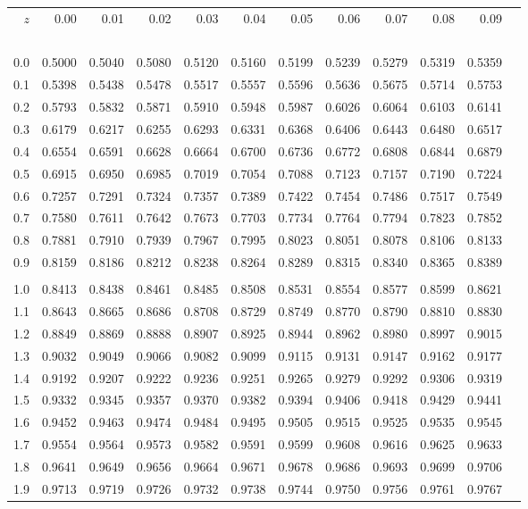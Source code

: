 \documentclass[a4paper,12pt, twoside]{article}
\begin{document}
\begin{center}
\renewcommand{\arraystretch}{0.8}
\small
\begin{tabular}{rr@{\ }r@{\ }r@{\ }r@{\ }r@{\ }r@{\ }r@{\ }r@{\ }r@{\ }r@{\ }r}
$z$&0.00&0.01&0.02&0.03&0.04&0.05&0.06&0.07&0.08&0.09\\
\ \\
0.0&0.5000&0.5040&0.5080&0.5120&0.5160&0.5199&0.5239&0.5279&0.5319&0.5359\\
0.1&0.5398&0.5438&0.5478&0.5517&0.5557&0.5596&0.5636&0.5675&0.5714&0.5753\\
0.2&0.5793&0.5832&0.5871&0.5910&0.5948&0.5987&0.6026&0.6064&0.6103&0.6141\\
0.3&0.6179&0.6217&0.6255&0.6293&0.6331&0.6368&0.6406&0.6443&0.6480&0.6517\\
0.4&0.6554&0.6591&0.6628&0.6664&0.6700&0.6736&0.6772&0.6808&0.6844&0.6879\\
0.5&0.6915&0.6950&0.6985&0.7019&0.7054&0.7088&0.7123&0.7157&0.7190&0.7224\\
0.6&0.7257&0.7291&0.7324&0.7357&0.7389&0.7422&0.7454&0.7486&0.7517&0.7549\\
0.7&0.7580&0.7611&0.7642&0.7673&0.7703&0.7734&0.7764&0.7794&0.7823&0.7852\\
0.8&0.7881&0.7910&0.7939&0.7967&0.7995&0.8023&0.8051&0.8078&0.8106&0.8133\\
0.9&0.8159&0.8186&0.8212&0.8238&0.8264&0.8289&0.8315&0.8340&0.8365&0.8389\\
\\
1.0&0.8413&0.8438&0.8461&0.8485&0.8508&0.8531&0.8554&0.8577&0.8599&0.8621\\
1.1&0.8643&0.8665&0.8686&0.8708&0.8729&0.8749&0.8770&0.8790&0.8810&0.8830\\
1.2&0.8849&0.8869&0.8888&0.8907&0.8925&0.8944&0.8962&0.8980&0.8997&0.9015\\
1.3&0.9032&0.9049&0.9066&0.9082&0.9099&0.9115&0.9131&0.9147&0.9162&0.9177\\
1.4&0.9192&0.9207&0.9222&0.9236&0.9251&0.9265&0.9279&0.9292&0.9306&0.9319\\
1.5&0.9332&0.9345&0.9357&0.9370&0.9382&0.9394&0.9406&0.9418&0.9429&0.9441\\
1.6&0.9452&0.9463&0.9474&0.9484&0.9495&0.9505&0.9515&0.9525&0.9535&0.9545\\
1.7&0.9554&0.9564&0.9573&0.9582&0.9591&0.9599&0.9608&0.9616&0.9625&0.9633\\
1.8&0.9641&0.9649&0.9656&0.9664&0.9671&0.9678&0.9686&0.9693&0.9699&0.9706\\
1.9&0.9713&0.9719&0.9726&0.9732&0.9738&0.9744&0.9750&0.9756&0.9761&0.9767\\

\end{tabular}
\end{center}
\end{document}
